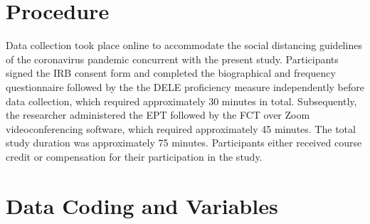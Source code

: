 \documentclass[
  english,
  man]{apa6}
\begin{document}
\hypertarget{procedure}{%
\section{Procedure}\label{procedure}}

Data collection took place online to accommodate the social distancing guidelines of the coronavirus pandemic concurrent with the present study. Participants signed the IRB consent form and completed the biographical and frequency questionnaire followed by the the DELE proficiency measure independently before data collection, which required approximately 30 minutes in total. Subsequently, the researcher administered the EPT followed by the FCT over Zoom videoconferencing software, which required approximately 45 minutes. The total study duration was approximately 75 minutes. Participants either received course credit or compensation for their participation in the study.

\hypertarget{data-coding-and-variables}{%
\section{Data Coding and Variables}\label{data-coding-and-variables}}
\end{document}
